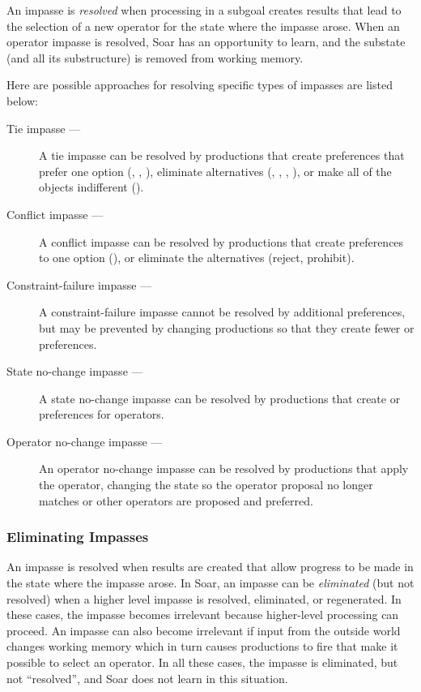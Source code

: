 An impasse is \textit{resolved} when processing in a subgoal creates
results that lead to the selection of a new operator for the state
where the impasse arose. When an operator impasse is resolved, Soar has
an opportunity to learn, and the substate (and all its substructure) is
removed from working memory.

Here are possible approaches for resolving specific types
of impasses are listed below:\vspace{-12pt}
\begin{description}
\item[Tie impasse ---]
	A tie impasse can be resolved by productions that create preferences
	that prefer one option (, , ),
	eliminate alternatives (, , ,
	), or make all of the objects indifferent
	().\vspace{-8pt}
\item[Conflict impasse ---]
	A conflict impasse can be resolved by productions that create
	preferences to  one option (), or
	eliminate the alternatives (reject, prohibit).\vspace{-8pt}
\item[Constraint-failure impasse ---]
	A constraint-failure impasse cannot be resolved by additional
	preferences, but may be prevented by changing productions so that they
	create fewer  or  preferences.\vspace{-8pt}
\item[State no-change impasse ---]
	A state no-change impasse can be resolved by productions that create 
	 or  preferences for operators.\vspace{-
8pt}
\item[Operator no-change impasse ---]
	An operator no-change impasse can be resolved by productions that
	apply the operator, changing the state so the operator proposal
	no longer matches or other operators are proposed and preferred.
\end{description}

\subsubsection*{Eliminating Impasses}

An impasse is resolved when results are created that allow progress to
be made in the state where the impasse arose.  In Soar, an impasse can be
\textit{eliminated} (but not resolved) when a higher level impasse is
resolved, eliminated, or regenerated.  In these cases, the impasse
becomes irrelevant because higher-level processing can proceed.  An
impasse can also become irrelevant if input from the outside world
changes working memory which in turn causes productions to fire that
make it possible to select an operator.  In all these cases, the impasse
is eliminated, but not ``resolved'', and Soar does not learn in this
situation.

